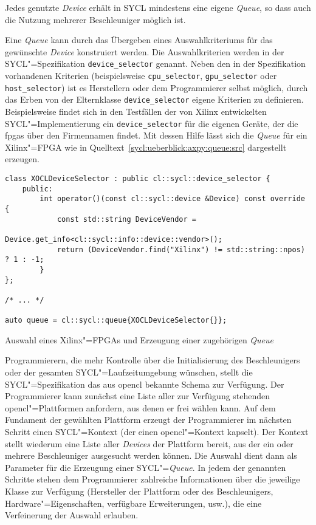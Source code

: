 Jedes genutzte \textit{Device} erhält in SYCL mindestens eine eigene
\textit{Queue}, so dass auch die Nutzung mehrerer Beschleuniger möglich ist.

Eine \textit{Queue} kann durch das Übergeben eines Auswahlkriteriums für das
gewünschte \textit{Device} konstruiert werden. Die Auswahlkriterien werden in
der SYCL"=Spezifikation \texttt{device\_selector} genannt. Neben den in der
Spezifikation vorhandenen Kriterien (beispielsweise \texttt{cpu\_selector},
\texttt{gpu\_selector} oder \texttt{host\_selector}) ist es Herstellern oder dem
Programmierer selbst möglich, durch das Erben von der Elternklasse
\texttt{device\_selector} eigene Kriterien zu definieren. Beispielsweise findet
sich in den Testfällen der von Xilinx entwickelten SYCL"=Implementierung ein
\texttt{device\_selector} für die eigenen Geräte, der die \gls{fpga}s über den
Firmennamen findet. Mit dessen Hilfe lässt sich die \textit{Queue} für ein
Xilinx"=FPGA wie in Quelltext~\ref{sycl:ueberblick:axpy:queue:src} dargestellt
erzeugen.
%
\begin{code}
    \begin{verbatim}
class XOCLDeviceSelector : public cl::sycl::device_selector {
    public:
        int operator()(const cl::sycl::device &Device) const override {
            const std::string DeviceVendor =
                            Device.get_info<cl::sycl::info::device::vendor>();
            return (DeviceVendor.find("Xilinx") != std::string::npos) ? 1 : -1;
        }
};

/* ... */

auto queue = cl::sycl::queue{XOCLDeviceSelector{}};
    \end{verbatim}
    \caption{Auswahl eines Xilinx"=FPGAs und Erzeugung einer zugehörigen
             \textit{Queue}}
    \label{sycl:ueberblick:axpy:queue:src}
\end{code}
%
\noindent
Programmierern, die mehr Kontrolle über die Initialisierung des Beschleunigers
oder der gesamten SYCL"=Laufzeitumgebung wünschen, stellt die
SYCL"=Spezifikation das aus \gls{opencl} bekannte Schema zur Verfügung. Der
Programmierer kann zunächst eine Liste aller zur Verfügung stehenden
\gls{opencl}"=Plattformen anfordern, aus denen er frei wählen kann. Auf dem
Fundament der gewählten Plattform erzeugt der Programmierer im nächsten Schritt
einen SYCL"=Kontext (der einen \gls{opencl}"=Kontext kapselt). Der Kontext
stellt wiederum eine Liste aller \textit{Devices} der Plattform bereit, aus der
ein oder mehrere Beschleuniger ausgesucht werden können. Die Auswahl dient dann
als Parameter für die Erzeugung einer SYCL"=\textit{Queue}. In jedem der
genannten Schritte stehen dem Programmierer zahlreiche Informationen über die
jeweilige Klasse zur Verfügung (Hersteller der Plattform oder des
Beschleunigers, Hardware"=Eigenschaften, verfügbare Erweiterungen, usw.), die
eine Verfeinerung der Auswahl erlauben.

